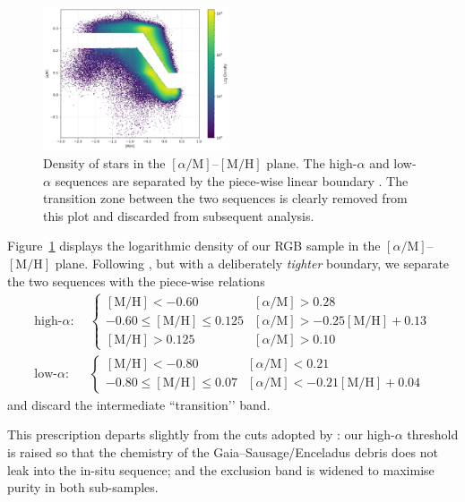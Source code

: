 \documentclass[a4paper,12pt]{article}
\begin{document}
\begin{figure}[h]
    \centering
    \includegraphics[width=0.49\textwidth]{../figures/alpha_vs_metalicity.png}
    \caption{Density of stars in the $[\alpha/\mathrm{M}]$–$[\mathrm{M/H}]$ plane.
             The high-$\alpha$ and low-$\alpha$ sequences are separated by the
             piece-wise linear boundary . The transition zone
             between the two sequences is clearly removed from this plot and discarded from
             subsequent analysis.}
    \label{fig:alphametal}
\end{figure}


  
Figure~\ref{fig:alphametal} displays the logarithmic density of our
RGB sample in the $[\alpha/\mathrm{M}]$–$[\mathrm{M/H}]$ plane.  Following
\citet{Chandra_2024}, but with a deliberately \emph{tighter} boundary, we
separate the two sequences with the piece-wise relations
%
\[
\begin{aligned}
\text{high-}\alpha:\;&
  \begin{cases}
    [\mathrm{M/H}]<-0.60 &
      [\alpha/\mathrm{M}]>0.28\\
    -0.60\le[\mathrm{M/H}]\le0.125 &
      [\alpha/\mathrm{M}]>-0.25[\mathrm{M/H}]+0.13\\
    [\mathrm{M/H}]>0.125 &
      [\alpha/\mathrm{M}]>0.10
  \end{cases}\\[4pt]
\text{low-}\alpha:\;&
  \begin{cases}
    [\mathrm{M/H}]<-0.80 &
      [\alpha/\mathrm{M}]<0.21\\
    -0.80\le[\mathrm{M/H}]\le0.07 &
      [\alpha/\mathrm{M}]<-0.21[\mathrm{M/H}]+0.04
  \end{cases}
\end{aligned}
\]
%
and discard the intermediate “transition’’ band.

This prescription departs slightly from the cuts adopted by
\citet{Chandra_2024}:  
our high-$\alpha$ threshold is raised so that the
chemistry of the Gaia–Sausage/Enceladus debris
\citep{Belokurov2018,Helmi2018} does not leak into the
in-situ sequence;  
and the exclusion band is widened to maximise purity in both
sub-samples.  
\end{document}
